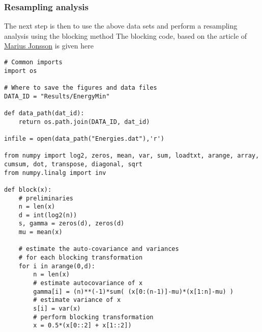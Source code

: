 \documentclass{beamer}
\begin{document}
\begin{frame}
\frametitle{Resampling analysis}

The next step is then to use the above data sets and perform a
resampling analysis using the blocking method
The blocking code, based on the article of \href{{https://journals.aps.org/pre/abstract/10.1103/PhysRevE.98.043304}}{Marius Jonsson} is given here


























































\begin{verbatim}
# Common imports
import os

# Where to save the figures and data files
DATA_ID = "Results/EnergyMin"

def data_path(dat_id):
    return os.path.join(DATA_ID, dat_id)

infile = open(data_path("Energies.dat"),'r')

from numpy import log2, zeros, mean, var, sum, loadtxt, arange, array, cumsum, dot, transpose, diagonal, sqrt
from numpy.linalg import inv

def block(x):
    # preliminaries
    n = len(x)
    d = int(log2(n))
    s, gamma = zeros(d), zeros(d)
    mu = mean(x)

    # estimate the auto-covariance and variances 
    # for each blocking transformation
    for i in arange(0,d):
        n = len(x)
        # estimate autocovariance of x
        gamma[i] = (n)**(-1)*sum( (x[0:(n-1)]-mu)*(x[1:n]-mu) )
        # estimate variance of x
        s[i] = var(x)
        # perform blocking transformation
        x = 0.5*(x[0::2] + x[1::2])
   

\end{verbatim}
\end{frame}
\end{document}
